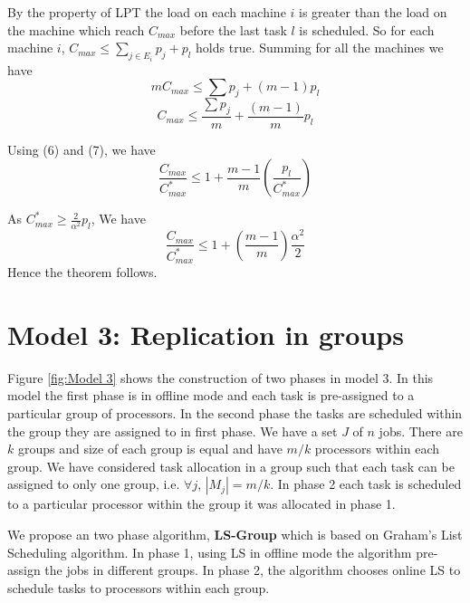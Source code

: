 \documentclass[10pt, conference, compsocconf]{IEEEtran}
\begin{document}
By the property of LPT the load on each machine $i$ is greater than the load on the machine which reach $C_{max}$ before the last task $l$ is scheduled. So for each machine $i$, $C_{max} \leq  \sum_{j \in E_i}^{}{p_j} + p_l$ holds true.  Summing for all the machines we have
\begin{equation}\nonumber 
mC_{max} \leq  \sum {p_j} + (m-1)p_l
\end{equation}
\begin{equation}
C_{max} \leq  \frac{\sum {p_j}}{m} + \frac{(m-1)}{m}p_l
\end{equation}

Using (6) and (7), we have
\begin{equation}\nonumber
\frac{C_{max}}{C_{max}^{*}} \leq 1 + {\frac{m-1}{m}}\left(\frac{p_l}{C_{max}^{*}}\right)
\end{equation}

As $C_{max}^{*} \geq {\frac{2}{\alpha^{2}}} p_l $, We have 
\begin{equation}\nonumber
\frac{C_{max}}{C_{max}^{*}} \leq 1 + \left(\frac{m-1}{m}\right)\frac{\alpha^{2}}{2}
\end{equation}
Hence the theorem follows.   \\                            

\section{Model 3: Replication in groups}
Figure \ref{fig:Model 3} shows the construction of two phases in model 3.  In this model the first phase is in offline mode and each task is pre-assigned to a particular  group of processors. In the second phase the tasks are scheduled  within the group they are assigned to in first phase.   We have a set $J$ of $ n$ jobs.  There are $k$ groups and size of each group is equal and have $m/k$ processors within each group.  We have considered task allocation in a group such that each task can be assigned to only one group, i.e. $\forall j$, $|M_j|= m/k$.  In phase 2  each task is scheduled to a particular processor within the group it was allocated in phase 1. 

 We propose an two phase algorithm, \textbf{LS-Group} which is based on Graham's List Scheduling algorithm. In phase 1, using LS in offline mode the algorithm pre-assign the jobs in different groups. In phase 2, the algorithm chooses online LS to schedule tasks to processors within each group.\\
\end{document}
